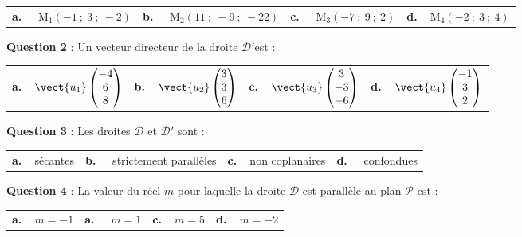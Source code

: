 \begin{center}
\begin{tabularx}{\linewidth}{*{4}{X}}
\textbf{a.~~} M$_1(-1~;~3~;~-2)$&\textbf{b.~~} M$_2(11~;~-9~;~-22)$&\textbf{c.~~} M$_3(-7~;~9~;~ 2)$&\textbf{d.~~}M$_4(-2~;~3~;~4)$
\end{tabularx}
\end{center}
\textbf{Question 2} : Un vecteur directeur de la droite $\mathcal{D}'$est :
\begin{center}
\begin{tabularx}{\linewidth}{*{4}{X}}
\textbf{a.~~}$\vect{u_1}\begin{pmatrix}-4\\6\\8\end{pmatrix}$&\textbf{b.~~}$\vect{u_2}\begin{pmatrix}3\\3\\6\end{pmatrix}$&\textbf{c.~~}$\vect{u_3}\begin{pmatrix}3\\-3\\-6\end{pmatrix}$&\textbf{d.~~}$\vect{u_4}\begin{pmatrix}-1\\3\\2\end{pmatrix}$
\end{tabularx}
\end{center}
\textbf{Question 3} : Les droites $\mathcal{D}$ et $\mathcal{D}'$ sont :
\begin{center}
\begin{tabularx}{\linewidth}{*{4}{X}}
\textbf{a.~~}sécantes &\textbf{b.~~} strictement parallèles&\textbf{c.~~}non coplanaires&\textbf{d.~~}
confondues
\end{tabularx}
\end{center}
\textbf{Question 4} : La valeur du réel $m$ pour laquelle la droite $\mathcal{D}$ est parallèle au plan $\mathcal{P}$ est :
\begin{center}
\begin{tabularx}{\linewidth}{*{4}{X}}
\textbf{a.~~}$m =-1$ &\textbf{a.~~} $m = 1$&\textbf{c.~~}$m = 5$&\textbf{d.~~}$m =-2$
\end{tabularx}
\end{center}

\bigskip

